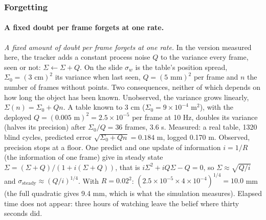 \documentclass[11pt]{article}
\newcommand{\slt}[1]{\emph{#1}}   %
\begin{document}
\subsubsection*{Forgetting}

\paragraph{A fixed doubt per frame forgets at one rate.} \slt{A fixed amount of doubt per frame forgets at one rate.} In the version measured here, the tracker adds a constant process noise $Q$ to the variance every frame, seen or not: $\Sigma\leftarrow\Sigma+Q$. On the slide $\sigma_w$ is the table's position spread, $\Sigma_0=(3\text{ cm})^2$ its variance when last seen, $Q=(5\text{ mm})^2$ per frame and $n$ the number of frames without points. Two consequences, neither of which depends on how long the object has been known. Unobserved, the variance grows linearly, $\Sigma(n)=\Sigma_0+Qn$. A table known to 3 cm ($\Sigma_0=9\times10^{-4}$ m$^2$), with the deployed $Q=(0.005\text{ m})^2=2.5\times10^{-5}$ per frame at 10 Hz, doubles its variance (halves its precision) after $\Sigma_0/Q=36$ frames, 3.6 s. Measured: a real table, 1320 blind cycles, predicted error $\sqrt{\Sigma_0+Qn}=0.184$ m, logged 0.170 m. Observed, precision stops at a floor. One predict and one update of information $i=1/R$ (the information of one frame) give in steady state $\Sigma=(\Sigma+Q)/(1+i(\Sigma+Q))$, that is $i\Sigma^2+iQ\Sigma-Q=0$, so $\Sigma\approx\sqrt{Q/i}$ and $\sigma_{\text{steady}}\approx(Q/i)^{1/4}$. With $R=0.02^2$: $(2.5\times10^{-5}\times4\times10^{-4})^{1/4}=10.0$ mm (the full quadratic gives 9.4 mm, which is what the simulation measures). Elapsed time does not appear: three hours of watching leave the belief where thirty seconds did.
\end{document}
